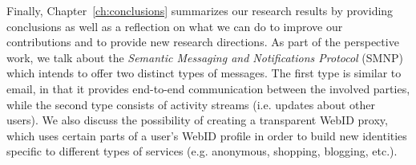 Finally, Chapter~\ref{ch:conclusions} summarizes our research results by providing conclusions as well as a reflection on what we can do to improve our contributions and to provide new research directions. As part of the perspective work, we talk about the \textit{Semantic Messaging and Notifications Protocol} (SMNP) which intends to offer two distinct types of messages. The first type is similar to email, in that it provides end-to-end communication between the involved parties, while the second type consists of activity streams (i.e. updates about other users). We also discuss the possibility of creating a transparent WebID proxy, which uses certain parts of a user's WebID profile in order to build new identities specific to different types of services (e.g. anonymous, shopping, blogging, etc.).
